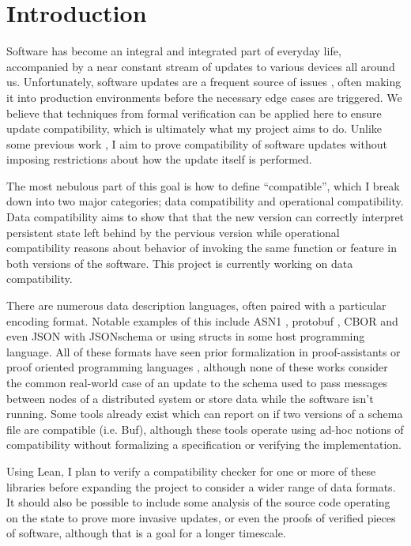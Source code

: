 \section{Introduction}

Software has become an integral and integrated part of everyday life, accompanied
by a near constant stream of updates to various devices all around
us. Unfortunately, software updates are a frequent source of issues
\autocites{zhangUnderstandingDetectingSoftware2021}[][]{Gray1986WhyDC}, often
making it into production environments before the necessary edge cases are
triggered. We believe that techniques from formal verification can be applied
here to ensure update compatibility, which is ultimately what my project aims to
do. Unlike some previous work
\autocites{ajmaniModularSoftwareUpgrades2006}[][]{reitblattAbstractionsNetworkUpdate2012},
I aim to prove compatibility of software updates without imposing restrictions
about how the update itself is performed.

The most nebulous part of this goal is how to define ``compatible'', which I
break down into two major categories; data compatibility and operational
compatibility. Data compatibility aims to show that that the new version can
correctly interpret persistent state left behind by the pervious version while
operational compatibility reasons about behavior of invoking the same function
or feature in both versions of the software. This project is currently working
on data compatibility.

There are numerous data description languages, often paired with a particular
encoding format. Notable examples of this include ASN1
\cite{ASN1EncodingRules2021}, protobuf \cite{LanguageGuideProto}, CBOR
\cite{birkholzConciseDataDefinition2019,bormannConciseBinaryObject2020} and even
JSON with JSONschema
\cite{wrightJSONSchemaMedia2022,brayJavaScriptObjectNotation2017} or using
structs in some host programming language. All of these formats have seen prior
formalization in proof-assistants or proof oriented programming languages
\cite{habibFindingDataCompatibility2021,ramananandroSecureParsingSerializing2025,yeVerifiedProtocolBuffer2019,niASN1ProvablyCorrect2023},
although none of these works consider the common real-world case of an update to
the schema used to pass messages between nodes of a distributed system or store
data while the software isn't running. Some tools already exist which can report
on if two versions of a schema file are compatible (i.e. Buf), although these
tools operate using ad-hoc notions of compatibility without formalizing a
specification or verifying the implementation.

Using Lean, I plan to verify a compatibility checker for one or more of
these libraries before expanding the project to consider a wider range of data
formats. It should also be possible to include some analysis of the source code
operating on the state to prove more invasive updates, or even the proofs of
verified pieces of software, although that is a goal for a longer timescale.

